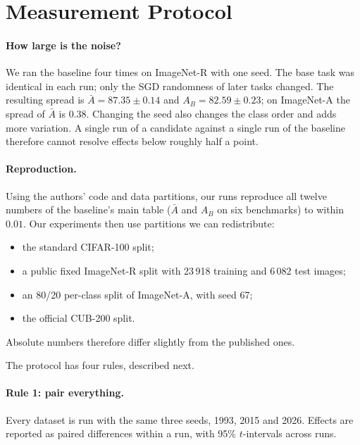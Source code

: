 \section{Measurement Protocol}
\label{sec:protocol}

\paragraph{How large is the noise?}
We ran the baseline four times on ImageNet-R with one seed. The base task
was identical in each run; only the SGD randomness of later tasks changed.
The resulting spread is $\bar A=87.35\pm0.14$ and $A_B=82.59\pm0.23$; on
ImageNet-A the spread of $\bar A$ is $0.38$. Changing the seed also changes
the class order and adds more variation. A single run of a candidate
against a single run of the baseline therefore cannot resolve effects below
roughly half a point.

\paragraph{Reproduction.}
Using the authors' code and data partitions, our runs reproduce all twelve
numbers of the baseline's main table ($\bar A$ and $A_B$ on six benchmarks) to
within $0.01$. Our experiments then use partitions we can redistribute:
\begin{itemize}
  \item the standard CIFAR-100 split;
  \item a public fixed ImageNet-R split with 23\,918 training and 6\,082 test images;
  \item an 80/20 per-class split of ImageNet-A, with seed 67;
  \item the official CUB-200 split.
\end{itemize}
Absolute numbers therefore differ slightly from the published ones.

The protocol has four rules, described next.

\paragraph{Rule 1: pair everything.}
Every dataset is run with the same three seeds, 1993, 2015 and 2026.
Effects are reported as paired differences within a run, with 95\%
$t$-intervals across runs.

